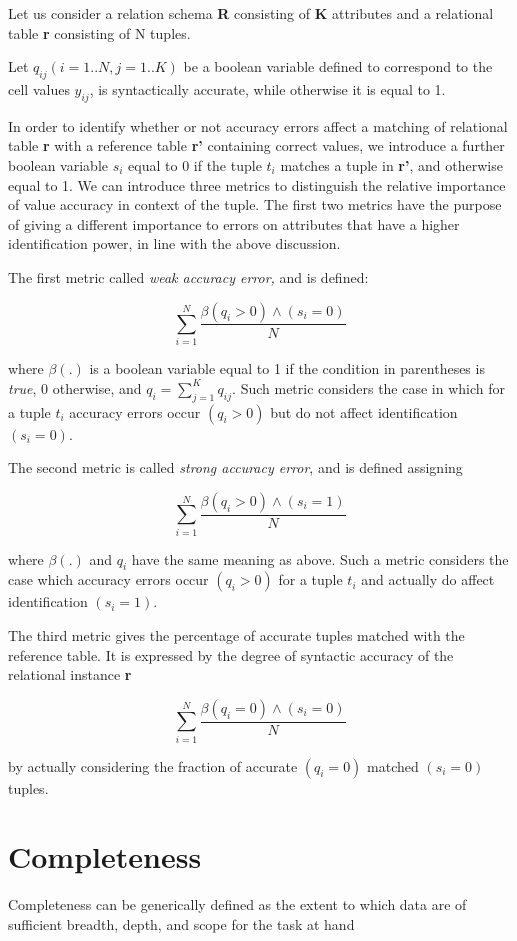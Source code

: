 Let us consider a relation schema \textbf{R} consisting of \textbf{K}
attributes and a relational table \textbf{r} consisting of N tuples. 

Let $q_{ij}(i=1..N, j=1..K)$ be a boolean variable defined to correspond to the cell values 
$y_{ij}$, is syntactically accurate, while otherwise it is equal to 1. 

In order to identify whether or not accuracy errors affect a matching of 
relational table \textbf{r} with a reference table \textbf{r'} containing correct
values, we introduce a further boolean variable $s_i$ equal to 0 if the tuple $t_i$ 
matches a tuple in \textbf{r'}, and otherwise equal to 1. We can introduce three metrics to distinguish
the relative importance of value accuracy in context of the tuple.
The first two metrics have the purpose of giving a different importance to 
errors on attributes that have a higher identification power, in line with 
the above discussion.

The first metric called \textit{weak accuracy error,} and is defined:

\begin{equation*}
    \sum_{i = 1}^{N} \frac{\beta(q_i > 0)\wedge(s_i=0)}{N}
\end{equation*}

where $\beta(.)$ is a boolean variable equal to 1 if the condition in parentheses is 
\textit{true}, 0 otherwise, and $q_i =\sum\nolimits_{j=1}^K q_{ij}$. Such metric considers the case in 
which for a tuple $t_i$ accuracy errors occur $(q_i > 0)$ but do not affect identification
$(s_i = 0)$.

The second metric is called \textit{strong accuracy error}, and is defined assigning

\begin{equation*}
    \sum_{i = 1}^{N} \frac{\beta(q_i > 0)\wedge(s_i=1)}{N}
\end{equation*}

where $\beta(.)$ and $q_i$ have the same meaning as above. Such a metric considers
the case which accuracy errors occur $(q_i > 0)$ for a tuple $t_i$ and actually 
do affect identification $(s_i = 1)$.

The third metric gives the percentage of accurate tuples matched with
the reference table. It is expressed by the degree of syntactic accuracy of the
relational instance \textbf{r}

\begin{equation*}
    \sum_{i = 1}^{N} \frac{\beta(q_i =0)\wedge(s_i=0)}{N}
\end{equation*}

by actually considering the fraction of accurate $(q_i = 0)$ matched $(s_i =0)$ tuples.

\section{Completeness}
Completeness can be generically defined as the extent to which data are
of sufficient breadth, depth, and scope for the task at hand ~\citep{Wang} \citep{Jaro1985}
